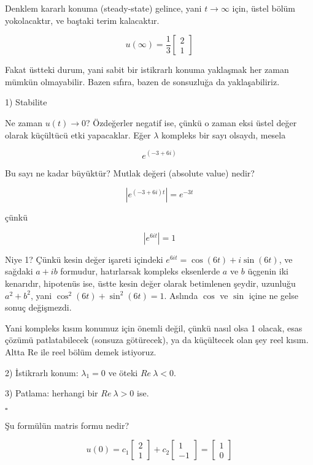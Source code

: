 \documentclass[12pt,fleqn]{article}\usepackage{../../common}
\begin{document}
Denklem kararlı konuma (steady-state) gelince, yani $t \rightarrow \infty$ için,
üstel bölüm yokolacaktır, ve baştaki terim kalacaktır. 

$$ u(\infty) =
\frac{1}{3}
\left[\begin{array}{c}
2 \\ 1
\end{array}\right]
 $$

Fakat üstteki durum, yani sabit bir istikrarlı konuma yaklaşmak her zaman
mümkün olmayabilir. Bazen sıfıra, bazen de sonsuzluğa da yaklaşabiliriz. 

1) Stabilite 

Ne zaman $u(t) \rightarrow 0$? Özdeğerler negatif ise, çünkü o zaman eksi
üstel değer olarak küçültücü etki yapacaklar. Eğer $\lambda$ kompleks bir
sayı olsaydı, mesela 

$$ e^{(-3 + 6i)} $$

Bu sayı ne kadar büyüktür? Mutlak değeri (absolute value) nedir? 

$$ | e^{(-3 + 6i)t}| = e^{-3t} $$

çünkü 

$$ |e^{6it}| = 1 $$

Niye 1? Çünkü kesin değer işareti içindeki $e^{6it} = \cos(6t)+i\sin(6t)$, ve
sağdaki $a+ib$ formudur, hatırlarsak kompleks eksenlerde $a$ ve $b$ üçgenin
iki kenarıdır, hipotenüs ise, üstte kesin değer olarak betimlenen şeydir,
uzunluğu $a^2 + b^2$, yani $\cos^2(6t) + \sin^2(6t) = 1$. Aslında $\cos$ ve
$\sin$ içine ne gelse sonuç değişmezdi. 

Yani kompleks kısım konumuz için önemli değil, çünkü nasıl olsa 1 olacak,
esas çözümü patlatabilecek (sonsuza götürecek), ya da küçültecek olan şey
reel kısım. Altta Re ile reel bölüm demek istiyoruz.

2) İstikrarlı konum: $\lambda_1 = 0$ ve öteki $Re \ \lambda < 0$. 

3) Patlama: herhangi bir $Re \ \lambda > 0$ ise. 

$\square$

Şu formülün matris formu nedir?

$$ u(0) =
c_1 
\left[\begin{array}{c}
2 \\ 1
\end{array}\right]
+
c_2 
\left[\begin{array}{c}
1 \\ -1
\end{array}\right] 
=
\left[\begin{array}{c}
1 \\ 0
\end{array}\right] 
$$
\end{document}
